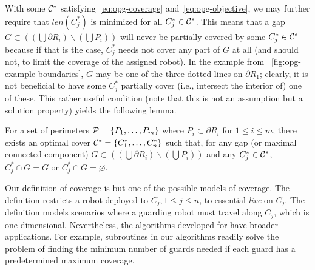 With some $\C^*$ satisfying~\eqref{eq:opg-coverage} 
and~\eqref{eq:opg-objective}, we may further require that $len(C_j^*)$ is 
minimized for all $C_j^* \in \C^*$. This means that a gap $G \subset 
((\bigcup \partial R_i)\backslash (\bigcup P_i))$ will never be partially 
covered by some $C_j^* \in \C^*$ because if that is the case, $C_j^*$ 
needs not cover any part of $G$ at all (and should not, to limit the 
coverage of the assigned robot). In the example from 
~\ref{fig:opg-example-boundaries}, $G$ may be one of the three dotted 
lines on $\partial R_1$; clearly, it is not beneficial to have some 
$C_j^*$ partially cover (i.e., intersect the interior of) one of these. 
This rather useful condition (note that this is not an assumption but 
a solution property) yields the following lemma. 

\begin{lemma}\label{l:opg-no-partial-coverage} 
For a set of perimeters $\P = \{P_1,\ldots, P_m\}$ where $P_i \subset 
\partial R_i$ for $1 \le i \le m$, there exists an optimal cover $\C^* 
= \{C_1^*, \ldots, C_n^*\}$ such that, for any gap (or maximal connected
component) $G \subset ((\bigcup \partial R_i)\backslash (\bigcup P_i))$ 
and any $C_j^* \in \C^*$, $C_j^* \cap G = G$ or $C_j^* \cap G = 
\varnothing$. 
\end{lemma}

\begin{remark} Our definition of coverage is but one of the possible 
models of coverage. The definition restricts a robot deployed to 
$C_j, 1 \le j \le n$, to essential {\em live} on $C_j$. The definition 
models scenarios where a guarding robot must travel along $C_j$, which 
is one-dimensional. Nevertheless, the algorithms developed for \opg have 
broader applications. For example, subroutines in our algorithms readily 
solve the problem of finding the minimum number of guards needed if each 
guard has a predetermined maximum coverage. 
\end{remark}
